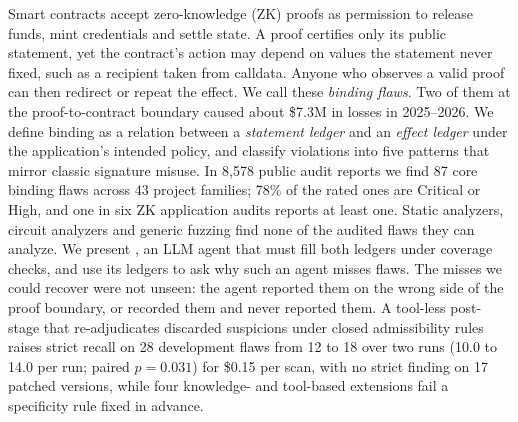Smart contracts accept zero-knowledge (ZK) proofs as permission to release
funds, mint credentials and settle state. A proof certifies only its public
statement, yet the contract's action may depend on values the statement never
fixed, such as a recipient taken from calldata. Anyone who observes a valid
proof can then redirect or repeat the effect. We call these \emph{binding
flaws}. Two of them at the proof-to-contract boundary caused about \$7.3M in
losses in 2025--2026. We define binding as a relation between a
\emph{statement ledger} and an \emph{effect ledger} under the application's
intended policy, and classify violations into five patterns that mirror
classic signature misuse. In 8,578 public audit reports we find 87 core
binding flaws across 43 project families; 78\% of the rated ones are Critical
or High, and one in six ZK application audits reports at least one. Static
analyzers, circuit analyzers and generic fuzzing find none of the audited
flaws they can analyze. We present \tool{}, an LLM agent that must fill both
ledgers under coverage checks, and use its ledgers to ask why such an agent
misses flaws. The misses we could recover were not unseen: the agent reported
them on the wrong side of the proof boundary, or recorded them and never
reported them. A tool-less
post-stage that re-adjudicates discarded suspicions under closed
admissibility rules raises strict recall on 28 development flaws from 12 to 18 over two runs
(10.0 to 14.0 per run; paired $p=0.031$) for \$0.15 per scan, with no strict finding on 17 patched
versions, while four knowledge- and tool-based extensions fail a
specificity rule fixed in advance. 
